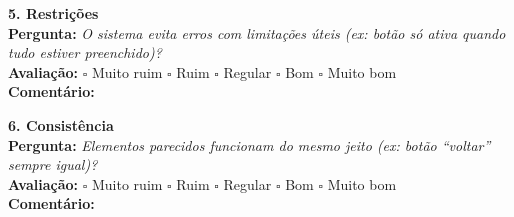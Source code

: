 \textbf{5. Restrições} \\
\textbf{Pergunta:} \textit{O sistema evita erros com limitações úteis (ex: botão só ativa quando tudo estiver preenchido)?} \\
\textbf{Avaliação:} $\square$ Muito ruim \hspace{0.5cm} $\square$ Ruim \hspace{0.5cm} $\square$ Regular \hspace{0.5cm} $\square$ Bom \hspace{0.5cm} $\square$ Muito bom \\
\textbf{Comentário:} \underline{\hspace{12cm}}

\textbf{6. Consistência} \\
\textbf{Pergunta:} \textit{Elementos parecidos funcionam do mesmo jeito (ex: botão “voltar” sempre igual)?} \\
\textbf{Avaliação:} $\square$ Muito ruim \hspace{0.5cm} $\square$ Ruim \hspace{0.5cm} $\square$ Regular \hspace{0.5cm} $\square$ Bom \hspace{0.5cm} $\square$ Muito bom \\
\textbf{Comentário:} \underline{\hspace{12cm}}
